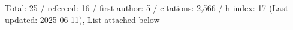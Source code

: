 Total: 25 / refereed: 16 / first author: 5 / citations: 2,566 / h-index: 17 (Last updated: 2025-06-11), List attached below